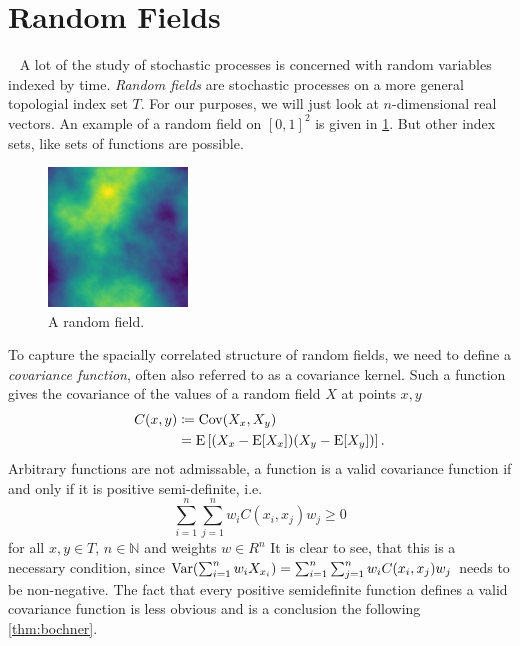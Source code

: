 \section{Random Fields}~\label{sec:random_fields}
% 
A lot of the study of stochastic processes is concerned with random variables indexed by time.
\textit{Random fields} are stochastic processes on a more general topologial index set \(T\). For our purposes, we will just look at \(n\)-dimensional real vectors. An example of a random field on \( [0,1]^2 \) is given in \cref{fig:random_field_single}.
But other index sets, like sets of functions are possible.

\begin{figure}
    \vspace{-15pt}
    \includegraphics[width=0.33\textwidth]{figures/random_field-img0.png}
    \caption{A random field.}
    \label{fig:random_field_single}
\end{figure}
To capture the spacially correlated structure of random fields, we need to define a \textit{covariance function}, often also referred to as a covariance kernel.
Such a function gives the covariance of the values of a random field $X$ at points $x,y$
\begin{align*}
    C(x,y) &\coloneqq \operatorname{Cov}(X_{x},X_{y})\\
    &= \operatorname*{E}\left[(X_{x} -\operatorname*{E}[X_{x}])(X_{y} -\operatorname*{E}[X_{y}])\right].
\end{align*}
Arbitrary functions are not admissable, a function is a valid covariance function if and only if it is positive semi-definite, i.e.
\[
    \sum_{i=1}^{n} \sum_{j=1}^{n} w_{i} C(x_{i},x_{j}) w_{j} \geq 0
\]
for all $x,y \in T$, $n \in \mathbb{N}$ and weights $w \in R^{n}$
It is clear to see, that this is a necessary condition, since 
\( \operatorname{Var}(\sum_{i=1}^{n} w_{i}X_{x_{i}}) = \sum_{i=1}^{n} \sum_{j=1}^{n} w_{i} C(x_{i},x_{j}) w_{j} \) needs to be non-negative. 
The fact that every positive semidefinite function defines a valid covariance function is less obvious and is a conclusion the following \cref{thm:bochner}.

